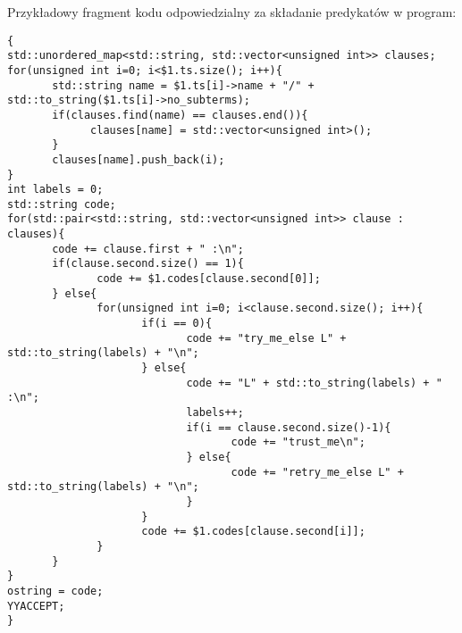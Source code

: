 \begin{minipage}{\textwidth}
Przykładowy fragment kodu odpowiedzialny za składanie predykatów w program:\\
\begin{verbatim}
{
std::unordered_map<std::string, std::vector<unsigned int>> clauses;
for(unsigned int i=0; i<$1.ts.size(); i++){
       std::string name = $1.ts[i]->name + "/" + std::to_string($1.ts[i]->no_subterms);
       if(clauses.find(name) == clauses.end()){
             clauses[name] = std::vector<unsigned int>();
       }
       clauses[name].push_back(i);
}
int labels = 0;
std::string code;
for(std::pair<std::string, std::vector<unsigned int>> clause : clauses){
       code += clause.first + " :\n";
       if(clause.second.size() == 1){
              code += $1.codes[clause.second[0]];
       } else{
              for(unsigned int i=0; i<clause.second.size(); i++){
                     if(i == 0){
                            code += "try_me_else L" + std::to_string(labels) + "\n";
                     } else{
                            code += "L" + std::to_string(labels) + " :\n";
                            labels++;
                            if(i == clause.second.size()-1){
                                   code += "trust_me\n";
                            } else{
                                   code += "retry_me_else L" + std::to_string(labels) + "\n";
                            }
                     }
                     code += $1.codes[clause.second[i]];
              }
       }
}
ostring = code;
YYACCEPT;
}
\end{verbatim}
\end{minipage}